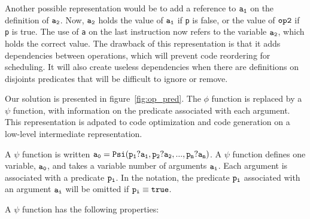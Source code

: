 Another possible representation would be to add a reference to ${\tt
  a_1}$ on the definition of ${\tt a_2}$. Now, ${\tt a_2}$ holds the
value of ${\tt a_1}$ if {\tt p} is false, or the value of ${\tt op2}$
if {\tt p} is true. The use of {\tt a} on the last instruction now
refers to the variable ${\tt a_2}$, which holds the correct value. The
drawback of this representation is that it adds dependencies between
operations, which will prevent code reordering for scheduling. It will
also create useless dependencies when there are definitions on
disjoints predicates that will be difficult to ignore or remove.

Our solution is presented in figure~\ref{fig:op_pred}. The $\phi$
function is replaced by a $\psi$ function, with information on the
predicate associated with each argument. This representation is
adpated to code optimization and code generation on a low-level
intermediate representation.

A $\psi$ function is written ${\tt a_0 = Psi(p_1?a_1, p_2?a_2, ...,
  p_n?a_n)}$. A $\psi$ function defines one variable, ${\tt a_0}$, and
takes a variable number of arguments ${\tt a_i}$. Each argument is
associated with a predicate ${\tt p_i}$. In the notation, the
predicate ${\tt p_i}$ associated with an argument ${\tt a_i}$ will be
omitted if ${\tt p_i \equiv true}$.

A $\psi$ function has the following properties:

